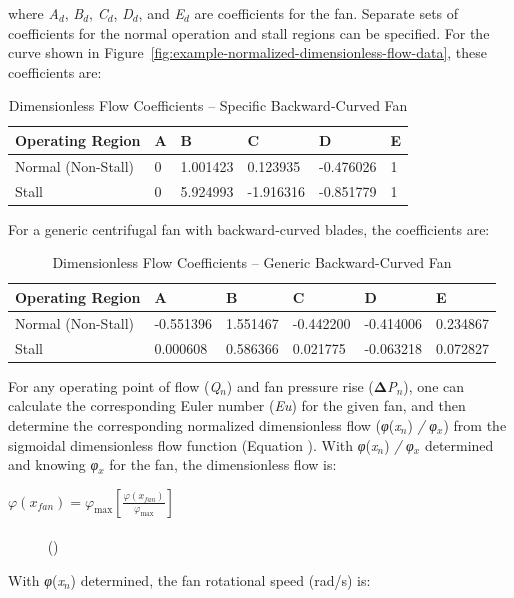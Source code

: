 where \emph{A\(_{d}\)}, \emph{B\(_{d}\)}, \emph{C\(_{d}\)}, \emph{D\(_{d}\)}, and \emph{E\(_{d}\)} are coefficients for the fan. Separate sets of coefficients for the normal operation and stall regions can be specified. For the curve shown in Figure~\ref{fig:example-normalized-dimensionless-flow-data}, these coefficients are:

\begin{longtable}[c]{@{}llllll@{}}
\caption{Dimensionless Flow Coefficients – Specific Backward-Curved Fan \protect \label{table:dimensionless-flow-coefficients-specific}}\\
\toprule 
Operating Region & A & B & C & D & E \tabularnewline \midrule
\endhead
Normal (Non-Stall) & 0 & 1.001423 & 0.123935 & -0.476026 & 1 \tabularnewline
Stall & 0 & 5.924993 & -1.916316 & -0.851779 & 1 \tabularnewline
\bottomrule
\end{longtable}

For a generic centrifugal fan with backward-curved blades, the coefficients are:

\begin{longtable}[c]{@{}llllll@{}}
\caption{Dimensionless Flow Coefficients – Generic Backward-Curved Fan \protect \label{table:dimensionless-flow-coefficients-generic}}\\
\toprule 
Operating Region & A & B & C & D & E \tabularnewline \midrule
\endhead
Normal (Non-Stall) & -0.551396 & 1.551467 & -0.442200 & -0.414006 & 0.234867 \tabularnewline
Stall & 0.000608 & 0.586366 & 0.021775 & -0.063218 & 0.072827 \tabularnewline
\bottomrule
\end{longtable}

For any operating point of flow (\emph{Q\(_{n}\)}) and fan pressure rise (\textbf{Δ}\emph{P\(_{n}\)}), one can calculate the corresponding Euler number (\emph{Eu}) for the given fan, and then determine the corresponding normalized dimensionless flow (\emph{φ}(\emph{x\(_{n}\)}) \emph{/} \emph{φ\(_{x}\)}) from the sigmoidal dimensionless flow function (Equation ). With \emph{φ}(\emph{x\(_{n}\)}) \emph{/} \emph{φ\(_{x}\)} determined and knowing \emph{φ\(_{x}\)} for the fan, the dimensionless flow is:

\(\varphi \left( {{x_{fan}}} \right) = {\varphi_{\max }}\left[ {\frac{{\varphi \left( {{x_{fan}}} \right)}}{{{\varphi_{\max }}}}} \right]\) ~~~~~~~~~~~~~~~~~~~~~~~~~~~~~~~~~~~~~~~~~~~~~~~~~~~~~~~~~~~~~~~~~~~~~~~~~~~~~ ()

With \emph{φ}(\emph{x\(_{n}\)}) determined, the fan rotational speed (rad/s) is:

